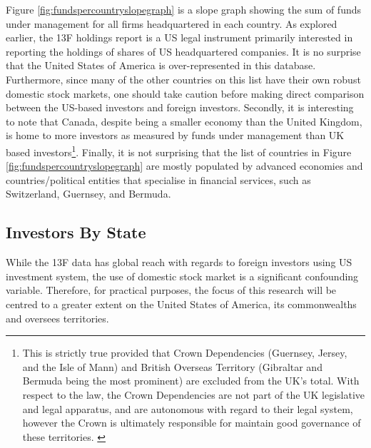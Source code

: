 Figure \ref{fig:fundspercountryslopegraph} is a slope graph showing the sum of funds under management for all firms headquartered in each country.  As explored earlier, the 13F holdings report is a US legal instrument primarily interested in reporting the holdings of shares of US headquartered companies. It is no surprise that the United States of America is over-represented in this database.  Furthermore, since many of the other countries on this list have their own robust domestic stock markets, one should take caution before making direct comparison between the US-based investors and foreign investors.  Secondly, it is interesting to note that Canada, despite being a smaller economy than the United Kingdom, is home to more investors as measured by funds under management than UK based investors\footnote{This is strictly true provided that Crown Dependencies (Guernsey, Jersey, and the Isle of Mann) and British Overseas Territory (Gibraltar and Bermuda being the most prominent) are excluded from the UK's total.  With respect to the law, the Crown Dependencies are not part of the UK legislative and legal apparatus, and are autonomous with regard to their legal system, however the Crown is ultimately responsible for maintain good governance of these territories.  \citep{CrownDependencies}}. Finally, it is not surprising that the list of countries in Figure \ref{fig:fundspercountryslopegraph} are mostly populated by advanced economies and countries/political entities that specialise in financial services, such as Switzerland, Guernsey, and Bermuda.



\subsection{Investors By State}

While the 13F data has global reach with regards to foreign investors using US investment system, the use of domestic stock market is a significant confounding variable.  Therefore, for practical purposes, the focus of this research will be centred to a greater extent on the United States of America, its commonwealths and oversees territories.

